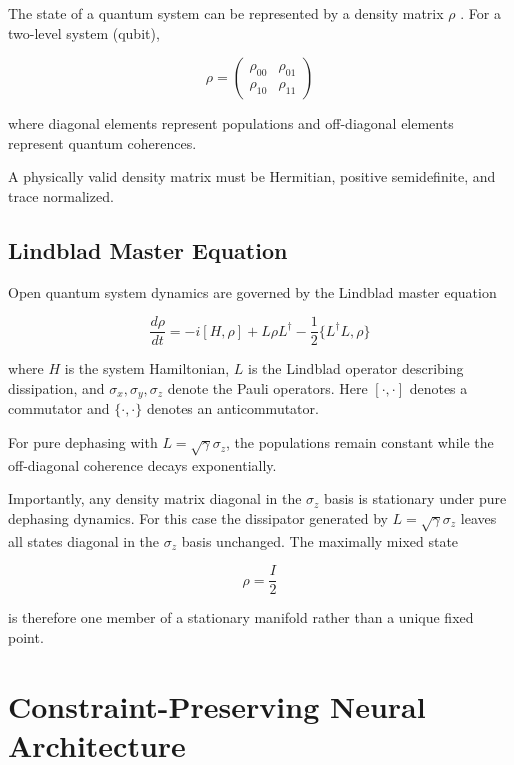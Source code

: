 \documentclass[11pt]{article}
\begin{document}
The state of a quantum system can be represented by a density matrix $\rho$ \cite{breuer2002}.
For a two-level system (qubit),

\begin{equation}
\rho =
\begin{pmatrix}
\rho_{00} & \rho_{01} \\
\rho_{10} & \rho_{11}
\end{pmatrix}
\label{densitymatrix}
\end{equation}

where diagonal elements represent populations and off-diagonal elements represent quantum coherences.

A physically valid density matrix must be Hermitian, positive semidefinite, and trace normalized.

\subsection{Lindblad Master Equation}

Open quantum system dynamics are governed by the Lindblad master equation \cite{lindblad1976,breuer2002}

\begin{equation}
\frac{d\rho}{dt}
=
-i[H,\rho]
+
L \rho L^\dagger
-
\frac{1}{2}
\{L^\dagger L,\rho\}
\label{lindblad}
\end{equation}

where $H$ is the system Hamiltonian, $L$ is the Lindblad operator describing dissipation, and $\sigma_x,\sigma_y,\sigma_z$ denote the Pauli operators. Here $[\cdot,\cdot]$ denotes a commutator and $\{\cdot,\cdot\}$ denotes an anticommutator.

For pure dephasing with $L = \sqrt{\gamma}\sigma_z$, the populations remain constant while the off-diagonal coherence decays exponentially.

Importantly, any density matrix diagonal in the $\sigma_z$ basis is stationary under pure dephasing dynamics.
For this case the dissipator generated by $L=\sqrt{\gamma}\sigma_z$ leaves all states diagonal in the $\sigma_z$ basis unchanged.
The maximally mixed state

\begin{equation}
\rho = \frac{I}{2}
\label{maxmixed}
\end{equation}

is therefore one member of a stationary manifold rather than a unique fixed point.

\section{Constraint-Preserving Neural Architecture}
\end{document}
